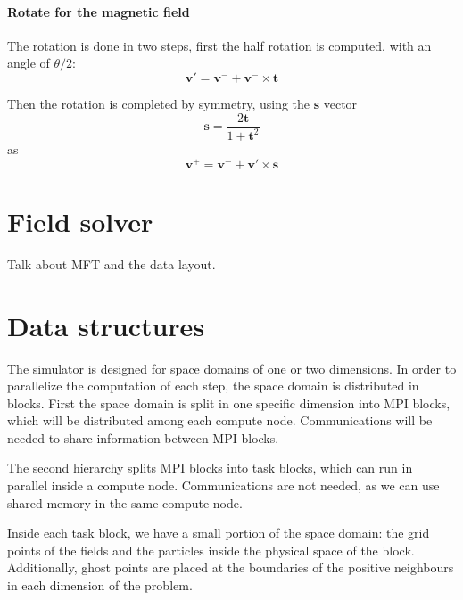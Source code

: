 \documentclass[a4paper]{report}
\newcommand*\V[1]{\bm{#1}}
\renewcommand*{\v}{\V{v}}
\begin{document}
\paragraph{Rotate for the magnetic field} The rotation is done in two steps, 
first the half rotation is computed, with an angle of $\theta/2$:
$$\v' = \v^- + \v^- \times \V t $$

Then the rotation is completed by symmetry, using the $\V s$ vector
$$ \V s = \frac{2 \V t}{1 + \V t^2} $$
as
$$ \V{v^+} = \V{v^-} + \V{v}' \times \V{s} $$

\section{Field solver}

Talk about MFT and the data layout.

\section{Data structures}

The simulator is designed for space domains of one or two dimensions. In order 
to parallelize the computation of each step, the space domain is distributed in 
blocks. First the space domain is split in one specific dimension into MPI 
blocks, which will be distributed among each compute node. Communications will 
be needed to share information between MPI blocks.

The second hierarchy splits MPI blocks into task blocks, which can run in 
parallel inside a compute node. Communications are not needed, as we can use 
shared memory in the same compute node.

Inside each task block, we have a small portion of the space domain: the grid 
points of the fields and the particles inside the physical space of the block.  
Additionally, ghost points are placed at the boundaries of the positive 
neighbours in each dimension of the problem.

\end{document}
